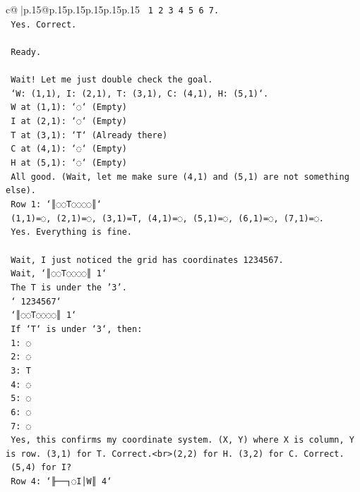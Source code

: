\documentclass{article}
\begin{document}
{\begin{supertabular}{c@{$\;$}|p{.15\linewidth}@{}p{.15\linewidth}p{.15\linewidth}p{.15\linewidth}p{.15\linewidth}p{.15\linewidth}}
{{{\texttt{    1 2 3 4 5 6 7.} \\
\texttt{    Yes. Correct.} \\
\\ 
\texttt{    Ready.} \\
\\ 
\texttt{    Wait! Let me just double check the goal.} \\
\texttt{    `W: (1,1), I: (2,1), T: (3,1), C: (4,1), H: (5,1)`.} \\
\texttt{    W at (1,1): `◌` (Empty)} \\
\texttt{    I at (2,1): `◌` (Empty)} \\
\texttt{    T at (3,1): `T` (Already there)} \\
\texttt{    C at (4,1): `◌` (Empty)} \\
\texttt{    H at (5,1): `◌` (Empty)} \\
\texttt{    All good. (Wait, let me make sure (4,1) and (5,1) are not something else).} \\
\texttt{    Row 1: `║◌◌T◌◌◌◌║`} \\
\texttt{    (1,1)=◌, (2,1)=◌, (3,1)=T, (4,1)=◌, (5,1)=◌, (6,1)=◌, (7,1)=◌.} \\
\texttt{    Yes. Everything is fine.} \\
\\ 
\texttt{    Wait, I just noticed the grid has coordinates 1234567.} \\
\texttt{    Wait, `║◌◌T◌◌◌◌║ 1`} \\
\texttt{    The T is under the '3'.} \\
\texttt{    ` 1234567`} \\
\texttt{    `║◌◌T◌◌◌◌║ 1`} \\
\texttt{    If `T` is under `3`, then:} \\
\texttt{    1: ◌} \\
\texttt{    2: ◌} \\
\texttt{    3: T} \\
\texttt{    4: ◌} \\
\texttt{    5: ◌} \\
\texttt{    6: ◌} \\
\texttt{    7: ◌} \\
\texttt{    Yes, this confirms my coordinate system. (X, Y) where X is column, Y is row. (3,1) for T. Correct.<br>(2,2) for H. (3,2) for C. Correct.} \\
\texttt{    (5,4) for I?} \\
\texttt{    Row 4: `╟──┐◌I│W║ 4`} \\
}}}
\end{supertabular}}
\end{document}
